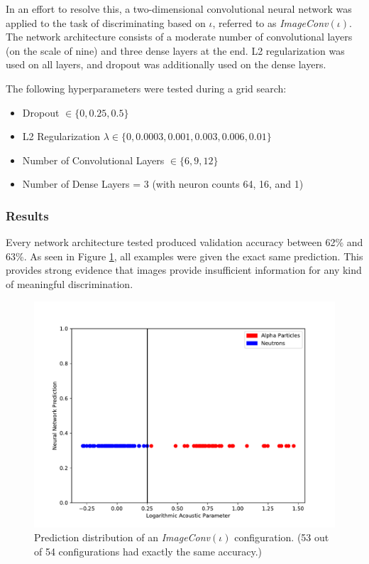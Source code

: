 \documentclass[10pt]{article}
\begin{document}
In an effort to resolve this, a two-dimensional convolutional neural network was applied to the task of discriminating based on $\iota$, referred to as {\it ImageConv}$(\iota)$. The network architecture consists of a moderate number of convolutional layers (on the scale of nine) and three dense layers at the end. L2 regularization was used on all layers, and dropout was additionally used on the dense layers.

The following hyperparameters were tested during a grid search:
\begin{itemize}
    \item Dropout $\in \{0, 0.25, 0.5\}$
    \item L2 Regularization $\lambda \in \{0, 0.0003, 0.001, 0.003, 0.006, 0.01\}$
    \item Number of Convolutional Layers $\in \{6, 9, 12\}$
    \item Number of Dense Layers = 3 (with neuron counts 64, 16, and 1)
\end{itemize}

\subsubsection{Results} \label{super_results}

Every network architecture tested produced validation accuracy between 62\% and 63\%. As seen in Figure \ref{image_hist}, all examples were given the exact same prediction. This provides strong evidence that images provide insufficient information for any kind of meaningful discrimination.

\begin{figure}[h]
    \centering
    \includegraphics[width=\textwidth]{image_hist}
    \caption{\label{image_hist} Prediction distribution of an {\it ImageConv}$(\iota)$ configuration. (53 out of 54 configurations had exactly the same accuracy.)}
\end{figure}
\end{document}
